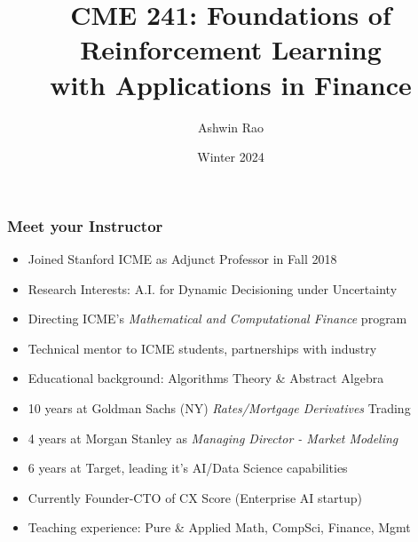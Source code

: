 \documentclass[handout]{beamer}
\title[``RL for Finance'' course]{CME 241: Foundations of Reinforcement Learning \\ with Applications in Finance} %
\author{Ashwin Rao} %
\institute[Stanford] %
{ICME, Stanford University
}
\date{Winter 2024} %
\begin{document}
\begin{frame}
\titlepage %
\end{frame}


\begin{frame}
\frametitle{Meet your Instructor}
\pause
\begin{itemize}[<+->]
\item Joined Stanford ICME as Adjunct Professor in Fall 2018
\item Research Interests: A.I. for Dynamic Decisioning under Uncertainty
\item Directing ICME's {\em Mathematical and Computational Finance} program
\item Technical mentor to ICME students, partnerships with industry
\item Educational background: Algorithms Theory \& Abstract Algebra
\item 10 years at Goldman Sachs (NY) {\em Rates/Mortgage Derivatives} Trading
\item 4 years at Morgan Stanley as {\em Managing Director - Market Modeling}
\item 6 years at Target, leading it's AI/Data Science capabilities
\item Currently Founder-CTO of CX Score (Enterprise AI startup)
\item Teaching experience: Pure \& Applied Math, CompSci, Finance, Mgmt
\end{itemize}
\end{frame}
\end{document}
